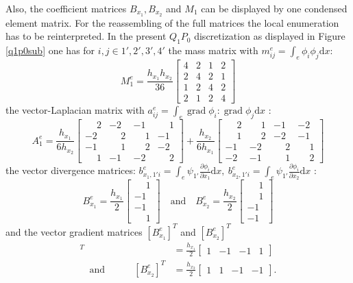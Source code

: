 \documentclass[a4paper,10pt,BCOR=15mm]{scrbook}
\DeclareMathOperator{\grad}{grad}
\providecommand{\inva}[1]{\text{d} #1}
\providecommand{\andi}[0]{\quad \text{and} \quad}
\begin{document}
Also, the coefficient matrices $B_{x_1},B_{x_2}$ and $M_1$ can be displayed by one condensed element matrix. For the reassembling of the full matrices the local enumeration has to be reinterpreted. In the present $Q_1P_0$ discretization as displayed in Figure \ref{q1p0sub} one has 
for $i,j\in{1',2',3',4'}$ the mass matrix with $m^e_{ij} = \int _e \phi_i \phi_j \inva x$:
\begin{equation*}
 M^e_1 = \frac{h_{x_1}h_{x_2}}{36}\begin{bmatrix} 4&2&1&2 \\ 2&4&2&1 \\ 1&2&4&2 \\ 2&1&2&4 \end{bmatrix}
\end{equation*}
the vector-Laplacian matrix with $a^e_{ij} = \int _e \grad \phi_i : \grad \phi_j \inva x$ :
\begin{equation*}
 A^e_1 = \frac{h_{x_1}}{6h_{x_2}}\begin{bmatrix} \phantom{-}2& -2&-1&\phantom{-}1 \\-2&\phantom{-}2&\phantom{-}1&-1 \\ -1&\phantom{-}1&\phantom{-}2&-2 \\ \phantom{-}1&-1&-2&\phantom{-}2 \end{bmatrix}+\frac{h_{x_2}}{6h_{x_1}}\begin{bmatrix} \phantom{-}2&\phantom{-}1&-1&-2 \\\phantom{-}1&\phantom{-}2&-2&-1 \\ -1&-2&\phantom{-}2&\phantom{-}1 \\ -2&-1&\phantom{-}1&\phantom{-}2 \end{bmatrix}
\end{equation*}
the vector divergence matrices: $b^e_{x_1,1'i} = \int _e \psi_{1'} \frac{\partial \phi_i}{ \partial x_1}\inva x,~ b^e_{x_2,1'i} = \int _e \psi_{1'} \frac{\partial \phi_i}{ \partial x_2}\inva x $ :
\begin{equation*}
B_{x_1}^e = \frac{h_{x_1}}{2}\begin{bmatrix}\phantom{-} 1 \\ -1 \\-1 \\\phantom{-}1 \end{bmatrix} \andi B_{x_2}^e = \frac{h_{x_2}}{2}\begin{bmatrix} \phantom{-}1 \\ \phantom{-}1 \\-1 \\-1 \end{bmatrix}
\end{equation*}
and the vector gradient matrices $[B_{x_1}^e]^T$ and $[B_{x_2}^e]^T$
\begin{align*}
[B_{x_1}^e]^T &= \frac{h_{x_1}}{2}\begin{bmatrix} 1 & -1 &-1 & 1 \end{bmatrix} \\ \andi \quad \quad
[ B_{x_2}^e]^T &= \frac{h_{x_2}}{2}\begin{bmatrix} 1 & 1 & -1 & -1 \end{bmatrix}.
\end{align*}
\end{document}
